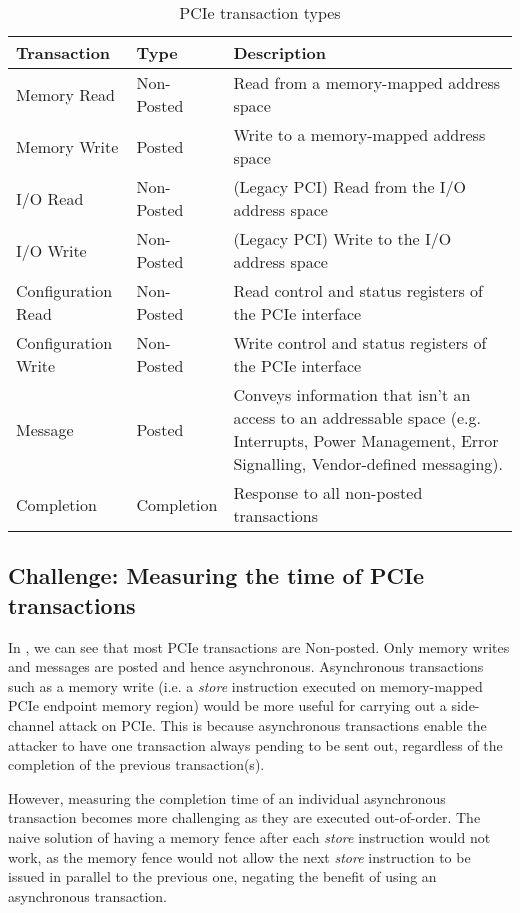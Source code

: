 \begin{table}[h]
    \centering
    \begin{tabular}{|l|l|p{}|}
        \hline
        \textbf{Transaction} & \textbf{Type} & \textbf{Description} \\ 
        \hline
        Memory Read         & Non-Posted & Read from a memory-mapped address space \\ 
        Memory Write        & Posted     & Write to a memory-mapped address space  \\ 
        I/O Read            & Non-Posted & (Legacy PCI) Read from the I/O address space \\ 
        I/O Write           & Non-Posted & (Legacy PCI) Write to the I/O address space \\ 
        Configuration Read  & Non-Posted & Read control and status registers of the PCIe interface \\ 
        Configuration Write & Non-Posted & Write control and status registers of the PCIe interface \\  
        Message             & Posted     & Conveys information that isn't an access to an addressable space (e.g. Interrupts, Power Management, Error Signalling, Vendor-defined messaging). \\
        Completion          & Completion & Response to all non-posted transactions \\ 
        \hline
    \end{tabular}
    \caption{PCIe transaction types}
    \label{tab:pcie-transaction-types}
\end{table}


\subsection{Challenge: Measuring the time of PCIe transactions}

In , we can see that most PCIe transactions are Non-posted.
Only memory writes and messages are posted and hence asynchronous.
Asynchronous transactions such as a memory write (i.e. a \textit{store} instruction executed on memory-mapped PCIe endpoint memory region) would be more useful for carrying out a side-channel attack on PCIe.
This is because asynchronous transactions enable the attacker to have one transaction always pending to be sent out, regardless of the completion of the previous transaction(s).

However, measuring the completion time of an individual asynchronous transaction becomes more challenging as they are executed out-of-order. 
The naive solution of having a memory fence after each \textit{store} instruction would not work, as the memory fence would not allow the next \textit{store} instruction to be issued in parallel to the previous one, negating the benefit of using an asynchronous transaction.



\endinput




https://www.linkedin.com/pulse/pci-express-primer-3-transaction-layer-simon-southwell/